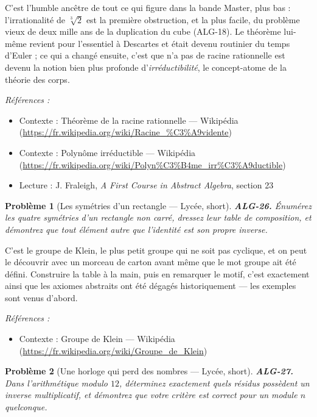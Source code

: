 \documentclass[11pt]{article}
\newtheorem{problem}{Problème}
\newenvironment{refs}{\par\small\noindent\emph{Références :}\begin{itemize}\setlength\itemsep{0pt}}{\end{itemize}\normalsize}
\begin{document}
\noindent C'est l'humble ancêtre de tout ce qui figure dans la bande Master, plus bas : l'irrationalité
de $\sqrt[3]{2}$ est la première obstruction, et la plus facile, du problème vieux de deux mille ans de la
duplication du cube (ALG-18). Le théorème lui-même revient pour l'essentiel à Descartes et était devenu
routinier du temps d'Euler ; ce qui a changé ensuite, c'est que \og{} n'a pas de racine rationnelle \fg{} est devenu la
notion bien plus profonde d'\textit{irréductibilité}, le concept-atome de la théorie des corps.

\begin{refs}
\item Contexte : Théorème de la racine rationnelle --- Wikipédia (\url{https://fr.wikipedia.org/wiki/Racine_%C3%A9vidente})
\item Contexte : Polynôme irréductible --- Wikipédia (\url{https://fr.wikipedia.org/wiki/Polyn%C3%B4me_irr%C3%A9ductible})
\item Lecture : J. Fraleigh, \textit{A First Course in Abstract Algebra}, section 23
\end{refs}

\bigskip

\begin{problem}[{Les symétries d'un rectangle --- Lycée, short}]
\textbf{ALG-26.} Énumérez les quatre symétries d'un rectangle non carré, dressez leur table de composition, et démontrez que tout élément autre que l'identité est son propre inverse.
\end{problem}

\noindent C'est le groupe de Klein, le plus petit groupe qui ne soit pas cyclique, et on peut le découvrir avec un morceau de carton avant même que le mot \og{} groupe \fg{} ait été défini. Construire la table à la main, puis en remarquer le motif, c'est exactement ainsi que les axiomes abstraits ont été dégagés historiquement --- les exemples sont venus d'abord.

\begin{refs}
\item Contexte : Groupe de Klein --- Wikipédia (\url{https://fr.wikipedia.org/wiki/Groupe_de_Klein})
\end{refs}

\bigskip

\begin{problem}[{Une horloge qui perd des nombres --- Lycée, short}]
\textbf{ALG-27.} Dans l'arithmétique modulo $ 12 $, déterminez exactement quels résidus possèdent un inverse multiplicatif, et démontrez que votre critère est correct pour un module $ n $ quelconque.
\end{problem}
\end{document}
